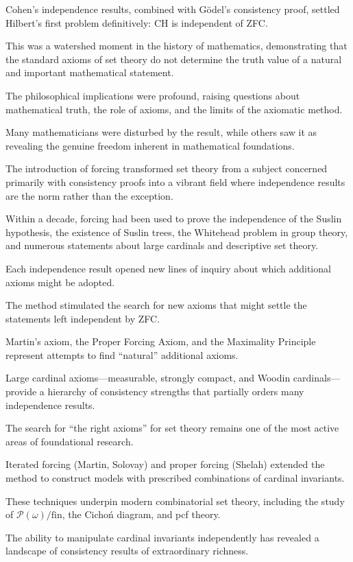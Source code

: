 Cohen's independence results, combined with Gödel's consistency proof, settled Hilbert's first problem definitively: CH is independent of ZFC.

This was a watershed moment in the history of mathematics, demonstrating that the standard axioms of set theory do not determine the truth value of a natural and important mathematical statement.

The philosophical implications were profound, raising questions about mathematical truth, the role of axioms, and the limits of the axiomatic method.

Many mathematicians were disturbed by the result, while others saw it as revealing the genuine freedom inherent in mathematical foundations.

The introduction of forcing transformed set theory from a subject concerned primarily with consistency proofs into a vibrant field where independence results are the norm rather than the exception.

Within a decade, forcing had been used to prove the independence of the Suslin hypothesis, the existence of Suslin trees, the Whitehead problem in group theory, and numerous statements about large cardinals and descriptive set theory.

Each independence result opened new lines of inquiry about which additional axioms might be adopted.

The method stimulated the search for new axioms that might settle the statements left independent by ZFC.

Martin's axiom, the Proper Forcing Axiom, and the Maximality Principle represent attempts to find ``natural'' additional axioms.

Large cardinal axioms---measurable, strongly compact, and Woodin cardinals---provide a hierarchy of consistency strengths that partially orders many independence results.

The search for ``the right axioms'' for set theory remains one of the most active areas of foundational research.

Iterated forcing (Martin, Solovay) and proper forcing (Shelah) extended the method to construct models with prescribed combinations of cardinal invariants.

These techniques underpin modern combinatorial set theory, including the study of $\mathcal{P}(\omega)/\text{fin}$, the Cichoń diagram, and pcf theory.

The ability to manipulate cardinal invariants independently has revealed a landscape of consistency results of extraordinary richness.

